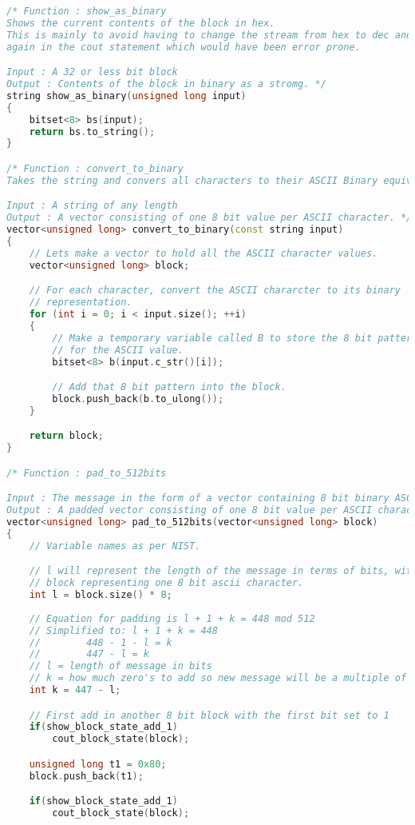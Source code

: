 \begin{lstlisting}[language = C++]
/* Function : show_as_binary
Shows the current contents of the block in hex.
This is mainly to avoid having to change the stream from hex to dec and back
again in the cout statement which would have been error prone.

Input : A 32 or less bit block
Output : Contents of the block in binary as a stromg. */
string show_as_binary(unsigned long input)
{
	bitset<8> bs(input);
	return bs.to_string();
}

/* Function : convert_to_binary
Takes the string and convers all characters to their ASCII Binary equivilents.

Input : A string of any length
Output : A vector consisting of one 8 bit value per ASCII character. */
vector<unsigned long> convert_to_binary(const string input)
{
	// Lets make a vector to hold all the ASCII character values.
	vector<unsigned long> block;

	// For each character, convert the ASCII chararcter to its binary
	// representation.
	for (int i = 0; i < input.size(); ++i)
	{
		// Make a temporary variable called B to store the 8 bit pattern
		// for the ASCII value.
		bitset<8> b(input.c_str()[i]);

		// Add that 8 bit pattern into the block.
		block.push_back(b.to_ulong());
	}

	return block;
}

/* Function : pad_to_512bits

Input : The message in the form of a vector containing 8 bit binary ASCII values.
Output : A padded vector consisting of one 8 bit value per ASCII character. */
vector<unsigned long> pad_to_512bits(vector<unsigned long> block)
{
	// Variable names as per NIST.

	// l will represent the length of the message in terms of bits, with each
	// block representing one 8 bit ascii character.
	int l = block.size() * 8;
	
	// Equation for padding is l + 1 + k = 448 mod 512
	// Simplified to: l + 1 + k = 448
	//		  448 - 1 - l = k
	//		  447 - l = k
	// l = length of message in bits
	// k = how much zero's to add so new message will be a multiple of 512.
	int k = 447 - l;

	// First add in another 8 bit block with the first bit set to 1
	if(show_block_state_add_1)
		cout_block_state(block);

	unsigned long t1 = 0x80;
	block.push_back(t1);

	if(show_block_state_add_1)
		cout_block_state(block);


\end{lstlisting}
